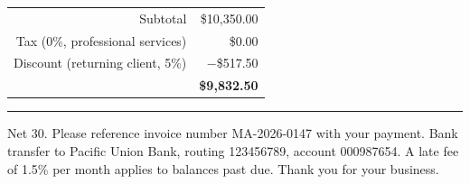\documentclass[10pt]{article}
\newcommand{\meta}[1]{{\small\color{inkgray}#1}}
\begin{document}
\vspace{10pt}

\hfill
\begin{tabular}{@{}r@{\hspace{14pt}}r@{}}
  \meta{Subtotal} & \$10,350.00\\
  \meta{Tax (0\%, professional services)} & \$0.00\\
  \meta{Discount (returning client, 5\%)} & $-$\$517.50\\
  \addlinespace[3pt]
  \midrule
  \addlinespace[3pt]
  {\bfseries Total due} & {\Large\bfseries\color{accent}\$9,832.50}\\
\end{tabular}

\vfill

{\color{accent}\rule{\linewidth}{0.8pt}}

\vspace{6pt}
\meta{{\bfseries Payment terms.} Net 30. Please reference invoice number
MA-2026-0147 with your payment. Bank transfer to Pacific Union Bank,
routing 123456789, account 000987654. A late fee of 1.5\% per month
applies to balances past due. Thank you for your business.}
\end{document}
